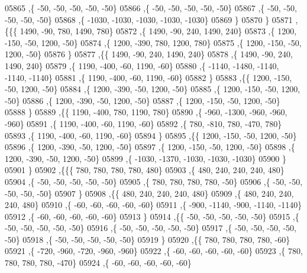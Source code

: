 \begin{DoxyCode}
05865     ,\{   -50,   -50,   -50,   -50,   -50\}
05866     ,\{   -50,   -50,   -50,   -50,   -50\}
05867     ,\{   -50,   -50,   -50,   -50,   -50\}
05868     ,\{ -1030, -1030, -1030, -1030, -1030\}
05869     \}
05870    \}
05871   ,\{\{\{  1490,   -90,   780,  1490,   780\}
05872     ,\{  1490,   -90,   240,  1490,   240\}
05873     ,\{  1200,  -150,   -50,  1200,   -50\}
05874     ,\{  1200,  -390,   780,  1200,   780\}
05875     ,\{  1200,  -150,   -50,  1200,   -50\}
05876     \}
05877    ,\{\{  1490,   -90,   240,  1490,   240\}
05878     ,\{  1490,   -90,   240,  1490,   240\}
05879     ,\{  1190,  -400,   -60,  1190,   -60\}
05880     ,\{ -1140, -1480, -1140, -1140, -1140\}
05881     ,\{  1190,  -400,   -60,  1190,   -60\}
05882     \}
05883    ,\{\{  1200,  -150,   -50,  1200,   -50\}
05884     ,\{  1200,  -390,   -50,  1200,   -50\}
05885     ,\{  1200,  -150,   -50,  1200,   -50\}
05886     ,\{  1200,  -390,   -50,  1200,   -50\}
05887     ,\{  1200,  -150,   -50,  1200,   -50\}
05888     \}
05889    ,\{\{  1190,  -400,   780,  1190,   780\}
05890     ,\{  -960, -1300,  -960,  -960,  -960\}
05891     ,\{  1190,  -400,   -60,  1190,   -60\}
05892     ,\{   780,  -810,   780,  -470,   780\}
05893     ,\{  1190,  -400,   -60,  1190,   -60\}
05894     \}
05895    ,\{\{  1200,  -150,   -50,  1200,   -50\}
05896     ,\{  1200,  -390,   -50,  1200,   -50\}
05897     ,\{  1200,  -150,   -50,  1200,   -50\}
05898     ,\{  1200,  -390,   -50,  1200,   -50\}
05899     ,\{ -1030, -1370, -1030, -1030, -1030\}
05900     \}
05901    \}
05902   ,\{\{\{   780,   780,   780,   780,   480\}
05903     ,\{   480,   240,   240,   240,   480\}
05904     ,\{   -50,   -50,   -50,   -50,   -50\}
05905     ,\{   780,   780,   780,   780,   -50\}
05906     ,\{   -50,   -50,   -50,   -50,   -50\}
05907     \}
05908    ,\{\{   480,   240,   240,   240,   480\}
05909     ,\{   480,   240,   240,   240,   480\}
05910     ,\{   -60,   -60,   -60,   -60,   -60\}
05911     ,\{  -900, -1140,  -900, -1140, -1140\}
05912     ,\{   -60,   -60,   -60,   -60,   -60\}
05913     \}
05914    ,\{\{   -50,   -50,   -50,   -50,   -50\}
05915     ,\{   -50,   -50,   -50,   -50,   -50\}
05916     ,\{   -50,   -50,   -50,   -50,   -50\}
05917     ,\{   -50,   -50,   -50,   -50,   -50\}
05918     ,\{   -50,   -50,   -50,   -50,   -50\}
05919     \}
05920    ,\{\{   780,   780,   780,   780,   -60\}
05921     ,\{  -720,  -960,  -720,  -960,  -960\}
05922     ,\{   -60,   -60,   -60,   -60,   -60\}
05923     ,\{   780,   780,   780,   780,  -470\}
05924     ,\{   -60,   -60,   -60,   -60,   -60\}

\end{DoxyCode}
